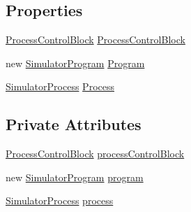 \subsection*{Properties}
\begin{DoxyCompactItemize}
\item 
\hyperlink{class_c_p_u___o_s___simulator_1_1_operating___system_1_1_process_control_block}{Process\+Control\+Block} \hyperlink{class_c_p_u___o_s___simulator_1_1_operating___system_1_1_process_execution_unit_a50dccf62e2bc43d1ad30f6488d3ffa58}{Process\+Control\+Block}
\item 
new \hyperlink{class_c_p_u___o_s___simulator_1_1_c_p_u_1_1_simulator_program}{Simulator\+Program} \hyperlink{class_c_p_u___o_s___simulator_1_1_operating___system_1_1_process_execution_unit_ad5ee10381cd66c0681f1a7be91b679e4}{Program}
\item 
\hyperlink{class_c_p_u___o_s___simulator_1_1_operating___system_1_1_simulator_process}{Simulator\+Process} \hyperlink{class_c_p_u___o_s___simulator_1_1_operating___system_1_1_process_execution_unit_a869fb898b0a61e168220757d921e5bfc}{Process}
\end{DoxyCompactItemize}
\subsection*{Private Attributes}
\begin{DoxyCompactItemize}
\item 
\hyperlink{class_c_p_u___o_s___simulator_1_1_operating___system_1_1_process_control_block}{Process\+Control\+Block} \hyperlink{class_c_p_u___o_s___simulator_1_1_operating___system_1_1_process_execution_unit_ae2624c872da8f348b1a9fcba8d6734cf}{process\+Control\+Block}
\item 
new \hyperlink{class_c_p_u___o_s___simulator_1_1_c_p_u_1_1_simulator_program}{Simulator\+Program} \hyperlink{class_c_p_u___o_s___simulator_1_1_operating___system_1_1_process_execution_unit_ab82d2f53e3b27f272a0c5a9cc6222e9d}{program}
\item 
\hyperlink{class_c_p_u___o_s___simulator_1_1_operating___system_1_1_simulator_process}{Simulator\+Process} \hyperlink{class_c_p_u___o_s___simulator_1_1_operating___system_1_1_process_execution_unit_a0a8944c15b618210fe91444a755991ca}{process}
\end{DoxyCompactItemize}


